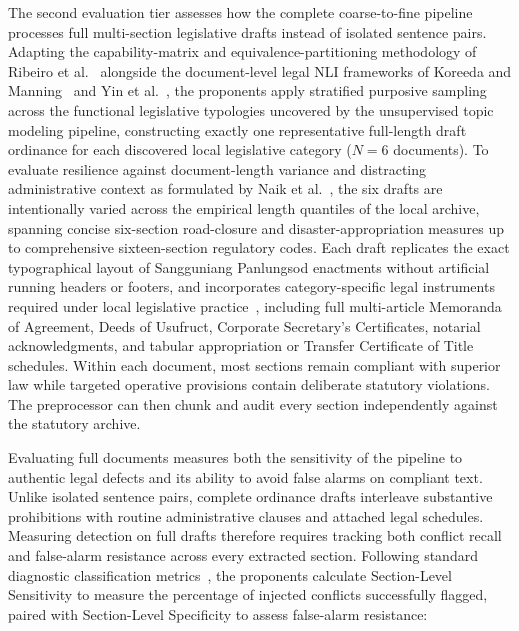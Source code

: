     The second evaluation tier assesses how the complete coarse-to-fine pipeline processes full multi-section legislative drafts instead of isolated sentence pairs. Adapting the capability-matrix and equivalence-partitioning methodology of Ribeiro et al.~\cite{ribeiro2020beyond} alongside the document-level legal NLI frameworks of Koreeda and Manning~\cite{koreeda2021contract} and Yin et al.~\cite{yin2021docnli}, the proponents apply stratified purposive sampling across the functional legislative typologies uncovered by the unsupervised topic modeling pipeline, constructing exactly one representative full-length draft ordinance for each discovered local legislative category ($N = 6$ documents). To evaluate resilience against document-length variance and distracting administrative context as formulated by Naik et al.~\cite{naik2018stress}, the six drafts are intentionally varied across the empirical length quantiles of the local archive, spanning concise six-section road-closure and disaster-appropriation measures up to comprehensive sixteen-section regulatory codes. Each draft replicates the exact typographical layout of Sangguniang Panlungsod enactments without artificial running headers or footers, and incorporates category-specific legal instruments required under local legislative practice~\cite{philgov1991ra7160, spdc2022ra00122}, including full multi-article Memoranda of Agreement, Deeds of Usufruct, Corporate Secretary's Certificates, notarial acknowledgments, and tabular appropriation or Transfer Certificate of Title schedules. Within each document, most sections remain compliant with superior law while targeted operative provisions contain deliberate statutory violations. The preprocessor can then chunk and audit every section independently against the statutory archive.

    Evaluating full documents measures both the sensitivity of the pipeline to authentic legal defects and its ability to avoid false alarms on compliant text. Unlike isolated sentence pairs, complete ordinance drafts interleave substantive prohibitions with routine administrative clauses and attached legal schedules. Measuring detection on full drafts therefore requires tracking both conflict recall and false-alarm resistance across every extracted section. Following standard diagnostic classification metrics~\cite{altman1994diagnostic, fawcett2006roc}, the proponents calculate Section-Level Sensitivity to measure the percentage of injected conflicts successfully flagged, paired with Section-Level Specificity to assess false-alarm resistance:

